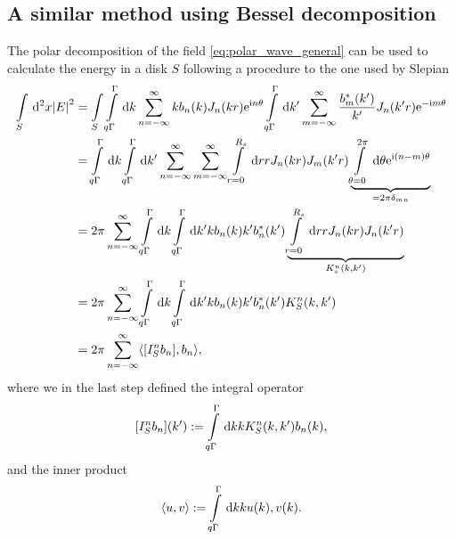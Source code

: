 \documentclass[11pt,a4paper, 
swedish,english %
]{article}
\begin{document}
\subsection{A similar method using Bessel decomposition}


The polar decomposition of the field \eqref{eq:polar_wave_general} can be used to calculate the energy in a disk $S$ following a procedure to the one used by Slepian %
\begin{equation}
  \label{eq:energy_bessel}
\begin{aligned}
\int_S \id^2x \abs{E}^2&= \int_S \int_{q\Gamma}^\Gamma \id k \sum_{n= -\infty}^{\infty} kb_n(k) J_n(kr)\ee^{\ii n \theta} \int_{q\Gamma}^\Gamma \id k' \sum_{m= -\infty}^{\infty} \frac{b_m^*(k')}{k'} J_n(k'r)\ee^{-\ii m \theta}\\
&=\int_{q\Gamma}^\Gamma \id k \int_{q\Gamma}^\Gamma \id k' \sum_{n= -\infty}^{\infty} \sum_{m= -\infty}^{\infty} \int_{r=0}^{R_s} \id r r J_n(kr)J_m(k'r)\underbrace{\int_{\theta=0}^{2\pi} \id \theta \ee^{\ii (n-m) \theta}}_{=2\pi \delta_{mn}}\\
&=2\pi \sum_{n=-\infty}^{\infty} \int_{q\Gamma}^\Gamma \id k \int_{q\Gamma}^\Gamma \id k'  kb_n(k) k'b_n^*(k') \underbrace{\int_{r=0}^{R_s} \id r r J_n(kr) J_n(k'r)}_{K_s^n(k,k')}\\
&=2\pi \sum_{n=-\infty}^{\infty} \int_{q\Gamma}^\Gamma \id k \int_{q\Gamma}^\Gamma \id k'  kb_n(k) k'b_n^*(k') K_S^n(k,k')\\
&=2\pi \sum_{n=-\infty}^{\infty} \langle [I_S^nb_n],b_n \rangle,
\end{aligned}
\end{equation}
where we in the last step defined the integral operator
\begin{equation}
  \label{eq:int_op_bessel}
[I_S^nb_n](k'):=\int_{q\Gamma}^\Gamma \id k k K_S^n(k,k')b_n(k),
\end{equation}
and the inner product
\begin{equation}
  \label{eq:in_prod_bessel}
\langle u,v \rangle := \int_{q\Gamma}^\Gamma \id k k u(k), v(k).
\end{equation}
\end{document}

